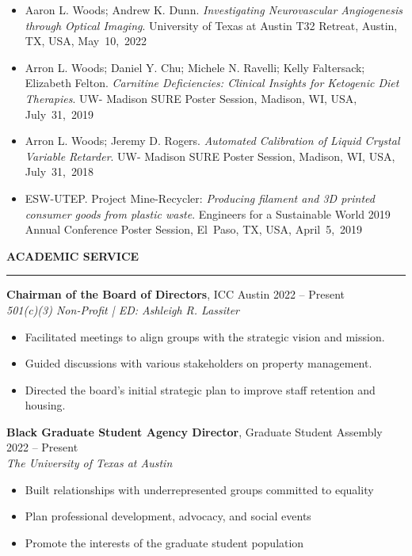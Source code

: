 \documentclass[12pt]{article}
\newcommand{\sectionheading}[1]{%
    \vspace{1.2ex}%
    {\large\bfseries\MakeUppercase{#1}}\par\vspace{0.3ex}%
    {\color[gray]{0.6}\rule{0.98\linewidth}{0.3pt}}\vspace{0.6ex}%
  }
\newcommand{\sectionheading}[1]{%
    \vspace{1.2ex}%
    {\large\bfseries{\SansHead \MakeUppercase{#1}}}\par\vspace{0.3ex}%
    {\color[gray]{0.6}\rule{0.98\linewidth}{0.3pt}}\vspace{0.6ex}%
  }
\begin{document}
\begin{itemize}
  \item Aaron L. Woods; Andrew K. Dunn. \textit{Investigating Neurovascular Angiogenesis through Optical Imaging}. University of Texas at Austin T32 Retreat, Austin, TX, USA, May~10,~2022
  \item Arron L. Woods; Daniel Y. Chu; Michele N. Ravelli; Kelly Faltersack; Elizabeth Felton. \textit{Carnitine Deficiencies: Clinical Insights for Ketogenic Diet Therapies}. UW- Madison SURE Poster Session, Madison, WI, USA, July~31,~2019
  \item Arron L. Woods; Jeremy D. Rogers. \textit{Automated Calibration of Liquid Crystal Variable Retarder}. UW- Madison SURE Poster Session, Madison, WI, USA, July~31,~2018
  \item ESW-UTEP. Project Mine-Recycler: \textit{Producing filament and 3D printed consumer goods from plastic waste}. Engineers for a Sustainable World 2019 Annual Conference Poster Session, El Paso, TX, USA, April~5,~2019
\end{itemize}

\sectionheading{Academic Service}

\textbf{Chairman of the Board of Directors}, ICC Austin \hfill 2022 -- Present\\
\textit{501(c)(3) Non-Profit \;|\; ED: Ashleigh R. Lassiter}
\begin{itemize}
  \item Facilitated meetings to align groups with the strategic vision and mission.
  \item Guided discussions with various stakeholders on property management.
  \item Directed the board’s initial strategic plan to improve staff retention and housing.
\end{itemize}

\textbf{Black Graduate Student Agency Director}, Graduate Student Assembly \hfill 2022 -- Present\\
\textit{The University of Texas at Austin}
\begin{itemize}
  \item Built relationships with underrepresented groups committed to equality
  \item Plan professional development, advocacy, and social events
  \item Promote the interests of the graduate student population
\end{itemize}
\end{document}
